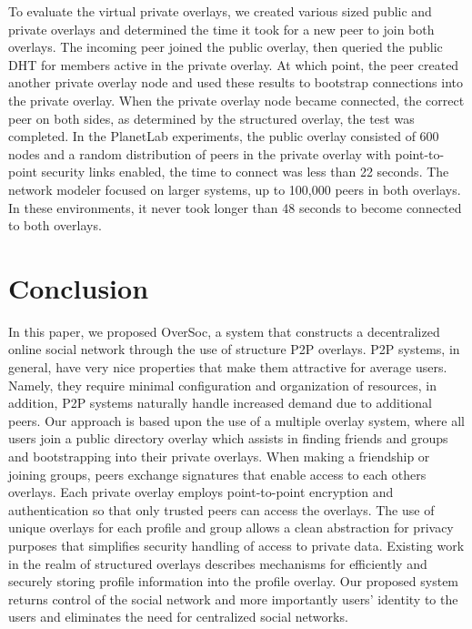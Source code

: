 \documentclass{sig-alternate}
\begin{document}
To evaluate the virtual private overlays, we created various sized public and
private overlays and determined the time it took for a new peer to join both
overlays.  The incoming peer joined the public overlay, then queried the public
DHT for members active in the private overlay.  At which point, the peer
created another private overlay node and used these results to bootstrap
connections into the private overlay.  When the private overlay node became
connected, the correct peer on both sides, as determined by the structured
overlay, the test was completed.  In the PlanetLab experiments, the public
overlay consisted of 600 nodes and a random distribution of peers in the
private overlay with point-to-point security links enabled, the time to connect
was less than 22 seconds.  The network modeler focused on larger systems, up to
100,000 peers in both overlays.  In these environments, it never took longer
than 48 seconds to become connected to both overlays.

\section{Conclusion}
\label{conclusion}

In this paper, we proposed OverSoc, a system that constructs a decentralized
online social network through the use of structure P2P overlays.  P2P systems,
in general, have very nice properties that make them attractive for average
users.  Namely, they require minimal configuration and organization of
resources, in addition, P2P systems naturally handle increased demand due to
additional peers.  Our approach is based upon the use of a multiple overlay
system, where all users join a public directory overlay which assists in
finding friends and groups and bootstrapping into their private overlays.  When
making a friendship or joining groups, peers exchange signatures that enable
access to each others overlays.  Each private overlay employs point-to-point
encryption and authentication so that only trusted peers can access the
overlays.  The use of unique overlays for each profile and group allows a clean
abstraction for privacy purposes that simplifies security handling of access to
private data.  Existing work in the realm of structured overlays describes
mechanisms for efficiently and securely storing profile information into the
profile overlay.  Our proposed system returns control of the social network and
more importantly users' identity to the users and eliminates the need for
centralized social networks.\\

{\small


}
\end{document}
